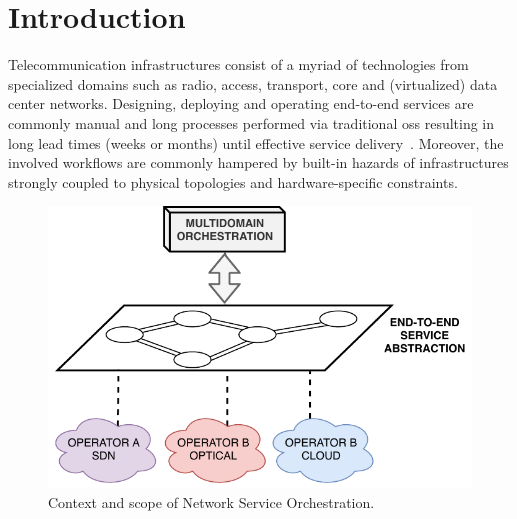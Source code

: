 \section{Introduction}

Telecommunication  infrastructures consist of a myriad of technologies from specialized domains such as radio,  access, transport, core and (virtualized) data center networks. Designing, deploying and operating end-to-end services are commonly   manual and long processes performed via traditional \gls{oss} resulting in long lead times (weeks or months) until effective service delivery~\cite{BluePlanet2017ProductsOrchestration}. Moreover, the involved workflows are commonly hampered by built-in hazards of infrastructures strongly coupled to physical topologies and hardware-specific constraints.

\begin{figure}[t!]
  \centering
  \includegraphics[scale=.75]{Figures/01_Introduction/intro}
    \caption{Context and scope of Network Service Orchestration.}
    \label{intro}
\end{figure}


